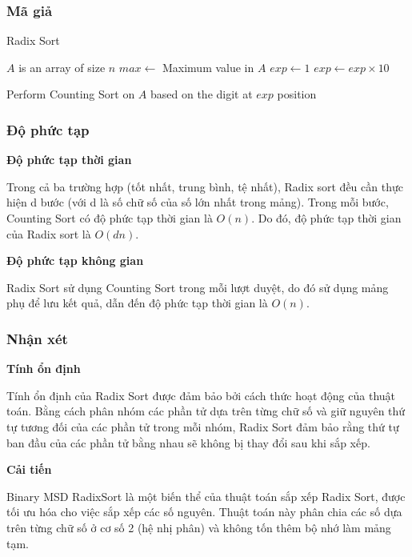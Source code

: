 \subsubsection{Mã giả}
 
\begin{algorithm}[H]
\caption{Radix Sort}
\label{alg:radix-sort}
\begin{algorithmic}

\Require $A$ is an array of size $n$
\State $max \gets$ Maximum value in $A$
\State $exp \gets 1$
    \State $exp \gets exp \times 10$
\EndWhile
\EndFunction

\State Perform Counting Sort on $A$ based on the digit at $exp$ position
\EndFunction

\end{algorithmic}
\end{algorithm}


\subsubsection{Độ phức tạp}

\textbf{Độ phức tạp thời gian}

Trong cả ba trường hợp (tốt nhất, trung bình, tệ nhất), Radix sort đều cần thực hiện d bước (với d là số chữ số của số lớn nhất trong mảng). Trong mỗi bước, Counting Sort có độ phức tạp thời gian là $O(n)$. Do đó, độ phức tạp thời gian của Radix sort là $O(dn)$.

\textbf{Độ phức tạp không gian}

Radix Sort sử dụng Counting Sort trong mỗi lượt duyệt, do đó sử dụng mảng phụ để lưu kết quả, dẫn đến độ phức tạp thời gian là $O(n)$.

\subsubsection{Nhận xét}

\textbf{Tính ổn định}

Tính ổn định của Radix Sort được đảm bảo bởi cách thức hoạt động của thuật toán. Bằng cách phân nhóm các phần tử dựa trên từng chữ số và giữ nguyên thứ tự tương đối của các phần tử trong mỗi nhóm, Radix Sort đảm bảo rằng thứ tự ban đầu của các phần tử bằng nhau sẽ không bị thay đổi sau khi sắp xếp.

\textbf{Cải tiến}

Binary MSD RadixSort là một biến thể của thuật toán sắp xếp Radix Sort, được tối ưu hóa cho việc sắp xếp các số nguyên. Thuật toán này phân chia các số dựa trên từng chữ số ở cơ số 2 (hệ nhị phân) và không tốn
thêm bộ nhớ làm mảng tạm.